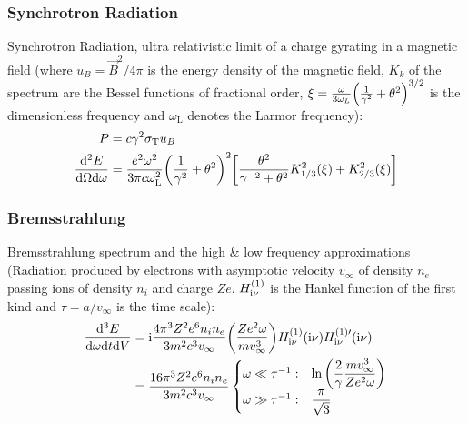 		\subsubsection{Synchrotron Radiation}
			\noindent
			Synchrotron Radiation, ultra relativistic limit of a charge gyrating in a magnetic field (where $u_B=\vec{B}^2/4\pi$ is the energy density of the magnetic field, $K_k$ of the spectrum are the Bessel functions of fractional order, $\xi=\frac{\omega}{3\omega_L}\qty(\frac{1}{\gamma^2}+\theta^2)^{3/2}$ is the dimensionless frequency and $\omega_\text{L}$ denotes the Larmor frequency):
			\begin{equation}
				\begin{aligned}
					P &= c \gamma^2 \sigma_\text{T} u_B \\
					\frac{\dd^2 E}{\dd\Omega\dd\omega} &= \frac{e^2 \omega^2}{3\pi c\omega_\text{L}^2} \qty(\frac{1}{\gamma^2} + \theta^2)^2\qty[\frac{\theta^2}{\gamma^{-2}+\theta^2} K_{1/3}^2(\xi) + K_{2/3}^2(\xi)]\\
				\end{aligned}
			\end{equation}

		\subsubsection{Bremsstrahlung}
			\noindent
			Bremsstrahlung spectrum and the high \& low frequency approximations (Radiation produced by electrons with asymptotic velocity $v_\infty$ of density $n_e$ passing ions of density $n_i$ and charge $Ze$. $H_{\mathrm{i} \nu}^{(1)}$ is the Hankel function of the first kind and $\tau=a / v_\infty$ is the time scale):
			\begin{equation}
				\begin{aligned}
					\frac{\dd^3 E}{\dd \omega \dd t \dd V} &= \mathrm{i} \frac{4\pi^3 Z^2 e^6 n_i n_e}{3m^2 c^3 v_\infty}\qty(\frac{Z e^2 \omega}{m v_\infty^3}) H_{\mathrm{i} \nu}^{(1)}(\mathrm{i}\nu) H_{\mathrm{i} \nu}^{(1)\prime}(\mathrm{i}\nu) \\
					&= \frac{16\pi^3 Z^2 e^6 n_i n_e}{3m^2 c^3 v_\infty}
					\begin{cases}
						\omega \ll \tau^{-1}: & \ln\qty(\dfrac{2}{\gamma}\dfrac{m v_{\infty}^3}{Z e^2 \omega}) \\
						\omega \gg \tau^{-1}: & \dfrac{\pi}{\sqrt{3}} \\
					\end{cases}\\
				\end{aligned}
			\end{equation}

